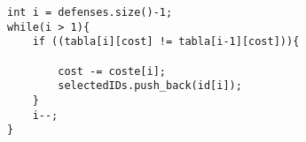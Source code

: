 \begin{lstlisting}
int i = defenses.size()-1;
while(i > 1){
    if ((tabla[i][cost] != tabla[i-1][cost])){

        cost -= coste[i];
        selectedIDs.push_back(id[i]);
    }
    i--;
}
\end{lstlisting}